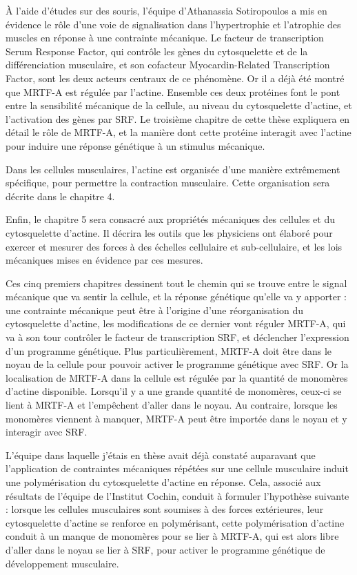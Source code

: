   À l'aide d'études sur des souris, l'équipe d'Athanassia Sotiropoulos a mis en évidence le rôle d'une voie de signalisation dans l'hypertrophie et l'atrophie des muscles en réponse à une contrainte mécanique. Le facteur de transcription Serum Response Factor, qui contrôle les gènes du cytosquelette et de la différenciation musculaire, et son cofacteur Myocardin-Related Transcription Factor, sont les deux acteurs centraux de ce phénomène. Or il a déjà été montré que MRTF-A est régulée par l'actine. Ensemble ces deux protéines font le pont entre la sensibilité mécanique de la cellule, au niveau du cytosquelette d'actine, et l'activation des gènes par SRF. Le troisième chapitre de cette thèse expliquera en détail le rôle de MRTF-A, et la manière dont cette protéine interagit avec l'actine pour induire une réponse génétique à un stimulus mécanique. 
  
  Dans les cellules musculaires, l'actine est organisée d'une manière extrêmement spécifique, pour permettre la contraction musculaire. Cette organisation sera décrite dans le chapitre 4. 
  
  Enfin, le chapitre 5 sera consacré aux propriétés mécaniques des cellules et du cytosquelette d'actine. Il décrira les outils que les physiciens ont élaboré pour exercer et mesurer des forces à des échelles cellulaire et sub-cellulaire, et les lois mécaniques mises en évidence par ces mesures. 
  
  Ces cinq premiers chapitres dessinent tout le chemin qui se trouve entre le signal mécanique que va sentir la cellule, et la réponse génétique qu'elle va y apporter : une contrainte mécanique peut être à l'origine d'une réorganisation du cytosquelette d'actine, les modifications de ce dernier vont réguler MRTF-A, qui va à son tour contrôler le facteur de transcription SRF, et déclencher l'expression d'un programme génétique. Plus particulièrement, MRTF-A doit être dans le noyau de la cellule pour pouvoir activer le programme génétique avec SRF. Or la localisation de MRTF-A dans la cellule est régulée par la quantité de monomères d'actine disponible. Lorsqu'il y a une grande quantité de monomères, ceux-ci se lient à MRTF-A et l'empêchent d'aller dans le noyau. Au contraire, lorsque les monomères viennent à manquer, MRTF-A peut être importée dans le noyau et y interagir avec SRF. 
  
  L'équipe dans laquelle j'étais en thèse avait déjà constaté auparavant que l'application de contraintes mécaniques répétées sur une cellule musculaire induit une polymérisation du cytosquelette d'actine en réponse. Cela, associé aux résultats de l'équipe de l'Institut Cochin, conduit à formuler l'hypothèse suivante : lorsque les cellules musculaires sont soumises à des forces extérieures, leur cytosquelette d'actine se renforce en polymérisant, cette polymérisation d'actine conduit à un manque de monomères pour se lier à MRTF-A, qui est alors libre d'aller dans le noyau se lier à SRF, pour activer le programme génétique de développement musculaire. 
  
